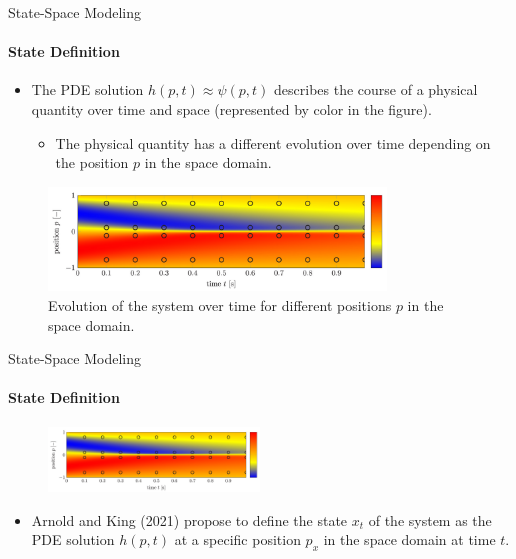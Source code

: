 \begin{frame}{State-Space Modeling}
\framesubtitle{State Definition}

\begin{itemize}
    \item The PDE solution $h(p, t) \approx \psi(p, t)$ describes the course of a physical quantity over time and space (represented by color in the figure).
    \begin{itemize}
        \item The physical quantity has a different evolution over time depending on the position $p$ in the space domain.
    \end{itemize}
\end{itemize}

\begin{figure}[H]
    \centering
    \includegraphics[width=0.8\textwidth]{img/state_space_time.png}
    \caption{Evolution of the system over time for different positions $p$ in the space domain.}
\end{figure}
\end{frame}

\begin{frame}{State-Space Modeling}
\framesubtitle{State Definition}
\begin{figure}[H]
    \centering
    \includegraphics[width=0.5\textwidth]{img/state_space_time.png}
\end{figure}

\begin{itemize}
\item Arnold and King (2021) propose to define the state $x_t$ of the system as the PDE solution $h(p, t)$ at a specific position $p_x$ in the space domain at time $t$.
\end{itemize}
\end{frame}

